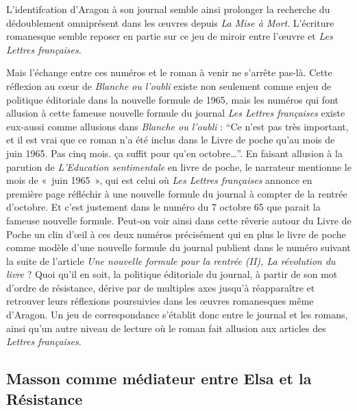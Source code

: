 L'identifcation d'Aragon à son journal semble ainsi prolonger la recherche du dédoublement omniprésent dans les \oe{}uvres depuis \emph{La Mise à Mort}. L'écriture romanesque semble reposer en partie sur ce jeu de miroir entre l'\oe{}uvre et \emph{Les Lettres françaises}.

Mais l’échange entre ces numéros et le roman à venir ne s’arrête pas-là. Cette réflexion au c\oe{}ur de \emph{Blanche ou l’oubli} existe non seulement comme enjeu de politique éditoriale dans la nouvelle formule de 1965, mais les numéros qui font allusion à cette fameuse nouvelle formule du journal \emph{Les Lettres françaises} existe eux-aussi comme allusions dans \emph{Blanche ou l’oubli} : \enquote{Ce n’est pas très important, et il est vrai que ce roman n’a été inclus dans le Livre de poche qu’au mois de juin 1965. Pas cinq mois. ça suffit pour qu’en octobre…}. En faisant allusion à la parution de \emph{L’Education sentimentale} en livre de poche, le narrateur mentionne le mois de « juin 1965 », qui est celui où \emph{Les Lettres françaises} annonce en première page réfléchir à une nouvelle formule du journal à compter de la rentrée d’octobre. Et c’est justement dans le numéro du 7 octobre 65 que parait la fameuse nouvelle formule. Peut-on voir ainsi dans cette rêverie autour du Livre de Poche un clin d’\oe{}il à ces deux numéros précisément qui en plus le livre de poche comme modèle d’une nouvelle formule du journal publient dans le numéro suivant la suite de l’article \emph{Une nouvelle formule pour la rentrée (II), La révolution du livre }? Quoi qu’il en soit, la politique éditoriale du journal, à partir de son mot d’ordre de résistance, dérive par de multiples axes jusqu’à réapparaître et retrouver leurs réflexions poursuivies dans les \oe{}uvres romanesques même d’Aragon. Un jeu de correspondance s’établit donc entre le journal et les romans, ainsi qu’un autre niveau de lecture où le roman fait allusion aux articles des \emph{Lettres françaises}. 


\subsection{Masson comme médiateur entre Elsa et la Résistance}

